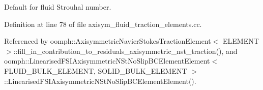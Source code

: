 Default for fluid Strouhal number. 



Definition at line 78 of file axisym\+\_\+fluid\+\_\+traction\+\_\+elements.\+cc.



Referenced by oomph\+::\+Axisymmetric\+Navier\+Stokes\+Traction\+Element$<$ E\+L\+E\+M\+E\+N\+T $>$\+::fill\+\_\+in\+\_\+contribution\+\_\+to\+\_\+residuals\+\_\+axisymmetric\+\_\+nst\+\_\+traction(), and oomph\+::\+Linearised\+F\+S\+I\+Axisymmetric\+N\+St\+No\+Slip\+B\+C\+Element\+Element$<$ F\+L\+U\+I\+D\+\_\+\+B\+U\+L\+K\+\_\+\+E\+L\+E\+M\+E\+N\+T, S\+O\+L\+I\+D\+\_\+\+B\+U\+L\+K\+\_\+\+E\+L\+E\+M\+E\+N\+T $>$\+::\+Linearised\+F\+S\+I\+Axisymmetric\+N\+St\+No\+Slip\+B\+C\+Element\+Element().

